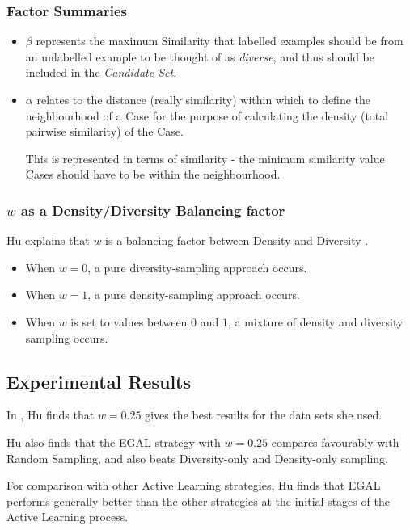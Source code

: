 \documentclass[a4paper,11pt]{report}
\begin{document}
\subsubsection{Factor Summaries}
\begin{itemize}
	\item $\beta$ represents the maximum Similarity that labelled examples should be from an unlabelled example to be thought of as \emph{diverse}, and thus should be included in the \emph{Candidate Set}.

	\item $\alpha$ relates to the distance (really similarity) within which to define the neighbourhood of a Case for the purpose of calculating the density (total pairwise similarity) of the Case. 
	
	This is represented in terms of similarity - the minimum similarity value Cases should have to be within the neighbourhood.
	
\end{itemize}

\subsubsection{$w$ as a Density/Diversity Balancing factor}
Hu explains that $w$ is a balancing factor between Density and Diversity \citep{Hu2010}. 

\begin{itemize}
	\item When $w=0$, a pure diversity-sampling approach occurs. 
	\item When $w=1$, a pure density-sampling approach occurs. 
	\item When $w$ is set to values between $0$ and $1$, a mixture of density and diversity sampling occurs.
\end{itemize}

\subsection{Experimental Results}
In \citet{Hu2011}, Hu finds that $w=0.25$ gives the best results for the data sets she used. 

Hu also finds that the EGAL strategy with $w=0.25$ compares favourably with Random Sampling, and also beats Diversity-only and Density-only sampling.

For comparison with other Active Learning strategies, Hu finds that EGAL performs generally better than the other strategies at the initial stages of the Active Learning process.
\end{document}

